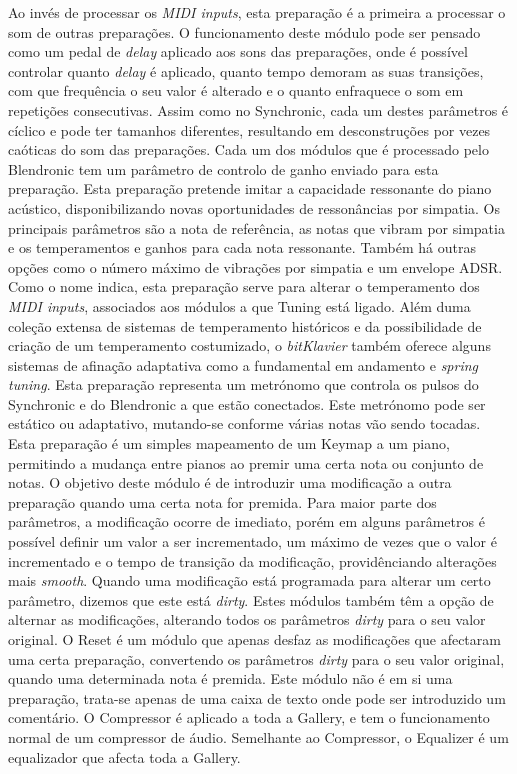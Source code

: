\documentclass[../main.tex]{subfiles}
\begin{document}
\begin{description}
     Ao invés de processar os \textit{MIDI inputs}, esta preparação é a primeira a processar o som de outras preparações. O funcionamento deste módulo pode ser pensado como um pedal de \textit{delay} aplicado aos sons das preparações, onde é possível controlar quanto \textit{delay} é aplicado, quanto tempo demoram as suas transições, com que frequência o seu valor é alterado e o quanto enfraquece o som em repetições consecutivas. Assim como no Synchronic, cada um destes parâmetros é cíclico e pode ter tamanhos diferentes, resultando em desconstruções por vezes caóticas do som das preparações. Cada um dos módulos que é processado pelo Blendronic tem um parâmetro de controlo de ganho enviado para esta preparação.
     Esta preparação pretende imitar a capacidade ressonante do piano acústico, disponibilizando novas oportunidades de ressonâncias por simpatia. Os principais parâmetros são a nota de referência, as notas que vibram por simpatia e os temperamentos e ganhos para cada nota ressonante. Também há outras opções como o número máximo de vibrações por simpatia e um envelope ADSR.
     Como o nome indica, esta preparação serve para alterar o temperamento dos \textit{MIDI inputs}, associados aos módulos a que Tuning está ligado. Além duma coleção extensa de sistemas de temperamento históricos e da possibilidade de criação de um temperamento costumizado, o \textit{bitKlavier} também oferece alguns sistemas de afinação adaptativa como a fundamental em andamento\cite{code2002} e \textit{spring tuning}\cite{sethares2005}.
     Esta preparação representa um metrónomo que controla os pulsos do Synchronic e do Blendronic a que estão conectados. Este metrónomo pode ser estático ou adaptativo, mutando-se conforme várias notas vão sendo tocadas.
     Esta preparação é um simples mapeamento de um Keymap a um piano, permitindo a mudança entre pianos ao premir uma certa nota ou conjunto de notas.
     O objetivo deste módulo é de introduzir uma modificação a outra preparação quando uma certa nota for premida. Para maior parte dos parâmetros, a modificação ocorre de imediato, porém em alguns parâmetros é possível definir um valor a ser incrementado, um máximo de vezes que o valor é incrementado e o tempo de transição da modificação, providênciando alterações mais \textit{smooth}. Quando uma modificação está programada para alterar um certo parâmetro, dizemos que este está \textit{dirty}. Estes módulos também têm a opção de alternar as modificações, alterando todos os parâmetros \textit{dirty} para o seu valor original.
     O Reset é um módulo que apenas desfaz as modificações que afectaram uma certa preparação, convertendo os parâmetros \textit{dirty} para o seu valor original, quando uma determinada nota é premida. 
     Este módulo não é em si uma preparação, trata-se apenas de uma caixa de texto onde pode ser introduzido um comentário.
     O Compressor é aplicado a toda a Gallery, e tem o funcionamento normal de um compressor de áudio.
     Semelhante ao Compressor, o Equalizer é um equalizador que afecta toda a Gallery.
\end{description}
\end{document}
